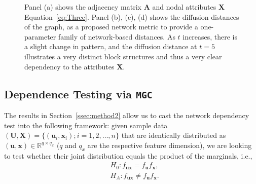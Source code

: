 \documentclass[11pt]{article}
\theoremstyle{definition}
\begin{document}
\begin{figure}[ht]
\begin{subfigure}[b]{0.23\textwidth}
		\caption{}
		\label{fig:d}
	\end{subfigure}
	\caption{Panel (a) shows the adjacency matrix $\mathbf{A}$ and nodal attributes $\mathbf{X}$ Equation~\ref{eq:Three}. Panel (b), (c), (d) shows the diffusion distances of the graph, as a proposed network metric to provide a one-parameter family of network-based distances. As $t$ increases, there is a slight change in pattern, and the diffusion distance at $t = 5$ illustrates a very distinct block structures and thus a very clear dependency to the attributes $\mathbf{X}$.}
	\label{fig:diffusions}
\end{figure}

	\vspace*{-0.4cm}
\subsection{Dependence Testing via \texttt{MGC}}
\label{ssec:method1}
The results in Section~\ref{ssec:method2} allow us to cast the network dependency test into the following framework: given sample data $(\mathbf{U}, \mathbf{X}) = \{  (\mathbf{u}_{i}, \mathbf{x}_{i} ) ; i = 1,2, \ldots, n \}$ that are identically distributed as $(\mathbf{u},\mathbf{x}) \in \mathbb{R}^{q \times q_x}$ ($q$ and $q_x$ are the respective feature dimension), we are looking to test whether their joint distribution equals the product of the marginals, i.e.,
\begin{align*}
& H_{0}: f_{\mathbf{u}\mathbf{x}}=f_{\mathbf{u}}f_{\mathbf{x}},\\
& H_{A}: f_{\mathbf{u}\mathbf{x}}\neq f_{\mathbf{u}}f_{\mathbf{x}}.
\end{align*}
\end{document}
